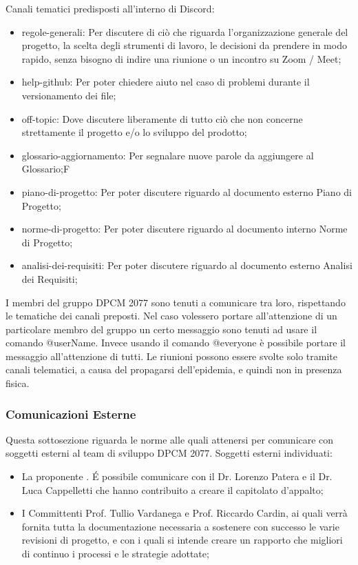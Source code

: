 Canali tematici predisposti all'interno di Discord:
\begin{itemize}
\item{regole-generali: Per discutere di ciò che riguarda l’organizzazione generale del progetto, la scelta degli strumenti di lavoro, le decisioni da prendere in modo rapido, senza bisogno di indire una riunione o un incontro  su Zoom / Meet;}
\item{help-github: Per poter chiedere aiuto nel caso di problemi durante il versionamento dei file;}
\item{off-topic: Dove discutere liberamente di tutto ciò che non concerne strettamente il progetto e/o lo sviluppo del prodotto;}
\item{glossario-aggiornamento: Per segnalare nuove parole da aggiungere al Glossario;}F
\item{piano-di-progetto: Per poter discutere riguardo al documento esterno Piano di Progetto;}
\item{norme-di-progetto: Per poter discutere riguardo al documento interno Norme di Progetto;}
\item{analisi-dei-requisiti: Per poter discutere riguardo al documento esterno Analisi dei Requisiti;}
\end{itemize}
I membri del gruppo DPCM 2077 sono tenuti a comunicare tra loro, rispettando le tematiche dei canali preposti. Nel caso volessero portare all’attenzione di un particolare membro del gruppo un certo messaggio sono tenuti ad usare
il comando @userName.
Invece usando il comando @everyone è possibile portare il messaggio all'attenzione di tutti.
Le riunioni possono essere svolte solo tramite canali telematici, a causa del propagarsi dell'epidemia, e quindi non in presenza fisica.

\subsubsection{Comunicazioni Esterne}
Questa sottosezione riguarda le norme alle quali attenersi per comunicare con soggetti esterni al team di sviluppo DPCM 2077.
Soggetti esterni individuati:
\begin{itemize}
\item{La proponente . \'E possibile comunicare con il Dr. Lorenzo Patera e il Dr. Luca Cappelletti che hanno contribuito a creare il capitolato d'appalto;}
\item{I Committenti Prof. Tullio Vardanega e Prof. Riccardo Cardin, ai quali verrà fornita tutta la documentazione necessaria a sostenere con successo le varie revisioni di progetto, e con i quali si intende creare un rapporto che migliori 
di continuo i processi e le strategie adottate;}
\end{itemize}


